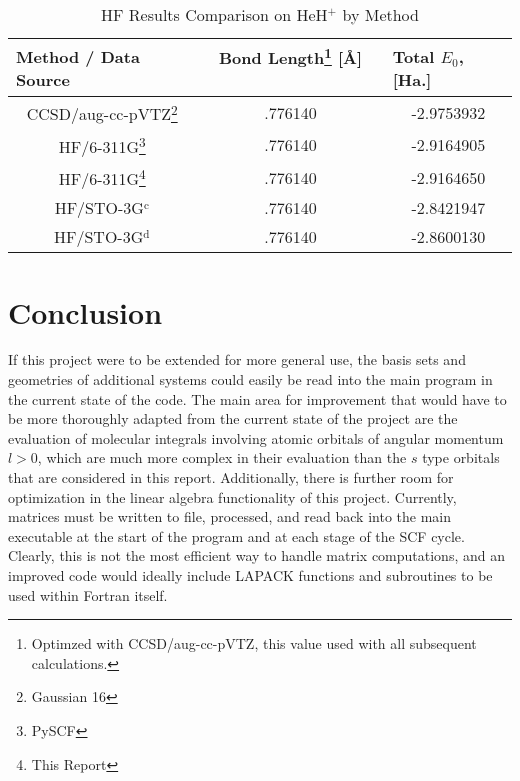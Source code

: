 \documentclass[%
 aip,
 amsmath,amssymb,
 reprint,%
]{revtex4-1}
\begin{document}
\begin{table}[]
\caption{HF Results Comparison on HeH$^{+}$ by Method}
\label{tab:hf_results}
\begin{ruledtabular}
\begin{tabular}{|c|c|c|}
\hline
\multicolumn{1}{|l|}{\textbf{Method / Data Source}} &
\multicolumn{1}{c|}{\textbf{Bond Length\footnote{Optimzed with
CCSD/aug-cc-pVTZ, this value used with all subsequent calculations.} [Å] \ \ \ \ }} 
& \multicolumn{1}{l|}{\textbf{Total $E_0$, [Ha.]}} \\ \hline
CCSD/aug-cc-pVTZ\footnote{Gaussian 16}      & .776140  & -2.9753932    \\ \hline 
HF/6-311G\footnote{PySCF}     & .776140     & -2.9164905    \\ \hline
HF/6-311G\footnote{This Report}  & .776140  &  -2.9164650         \\ \hline
HF/STO-3G$^{\text{c}}$ & .776140 & -2.8421947 \\ \hline
HF/STO-3G$^{\text{d}}$ & .776140 &  -2.8600130 \\ \hline
\end{tabular}
\end{ruledtabular}
\end{table}


\section{Conclusion}
If this project were to be extended for more general use, the basis sets and
geometries of additional systems could easily be read into the main program in
the current state of the code.  The main area
for improvement that would have to be more thoroughly adapted
from the current state of the project are the evaluation of molecular
integrals involving atomic orbitals of angular momentum $l > 0$, which are
much more complex in their evaluation than the $s$ type orbitals that are
considered in this report. Additionally, there is further room for
optimization in the linear algebra functionality of this project. Currently,
matrices must be written to file, processed, and read back into the main
executable at the start of the program and at each stage of the SCF cycle.
Clearly, this is not the most efficient way to handle matrix computations, and
an improved code would ideally include LAPACK functions and subroutines to be
used within Fortran itself.


\end{document}
